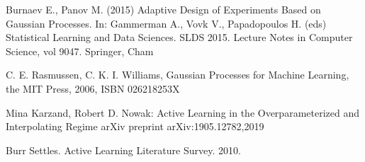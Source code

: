 \documentclass[a4paper]{article}
\begin{document}
\clearpage
\begin{thebibliography}{}

Burnaev E., Panov M. (2015) 
Adaptive Design of Experiments Based on Gaussian Processes. In: Gammerman A., Vovk V., Papadopoulos H. (eds) Statistical Learning and Data Sciences. SLDS 2015. 
Lecture Notes in Computer Science, vol 9047. Springer, Cham

C. E. Rasmussen, C. K. I. Williams, 
Gaussian Processes for Machine Learning, 
the MIT Press, 2006, ISBN 026218253X

Mina Karzand, Robert D. Nowak:
Active Learning in the Overparameterized
and Interpolating Regime
arXiv preprint arXiv:1905.12782,2019

Burr Settles. 
Active Learning Literature Survey.  
2010.

\end{thebibliography}
\end{document}
